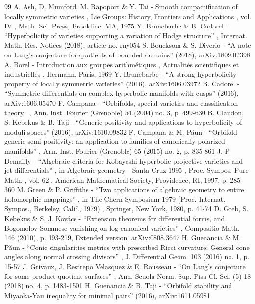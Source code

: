 \documentclass[10pt]{amsart}
\theoremstyle{plain}
\theoremstyle{definition}
\numberwithin{equation}{theorem}
\begin{document}
\begin{thebibliography}{99}
 A. Ash, D. Mumford, M. Rapoport \& Y. Tai - Smooth compactification of locally symmetric varieties , Lie Groups: History, Frontiers and Applications , vol. IV , Math. Sci. Press, Brookline, MA, 1975
 Y. Brunebarbe \& B. Cadorel - “Hyperbolicity of varieties supporting a variation of Hodge structure” , Internat. Math. Res. Notices (2018), article no. rny054
 S. Boucksom \& S. Diverio - “A note on Lang’s conjecture for quotients of bounded domains” (2018), arXiv:1809.02398
 A. Borel - Introduction aux groupes arithmétiques , Actualités scientifiques et industrielles , Hermann, Paris, 1969
 Y. Brunebarbe - “A strong hyperbolicity property of locally symmetric varieties” (2016), arXiv:1606.03972
 B. Cadorel - “Symmetric differentials on complex hyperbolic manifolds with cusps” (2016), arXiv:1606.05470
 F. Campana - “Orbifolds, special varieties and classification theory” , Ann. Inst. Fourier (Grenoble) 54 (2004) no. 3, p. 499-630
 B. Claudon, S. Kebekus \& B. Taji - “Generic positivity and applications to hyperbolicity of moduli spaces” (2016), arXiv:1610.09832
 F. Campana \& M. Păun - “Orbifold generic semi-positivity: an application to families of canonically polarized manifolds” , Ann. Inst. Fourier (Grenoble) 65 (2015) no. 2, p. 835-861
 J.-P. Demailly - “Algebraic criteria for Kobayashi hyperbolic projective varieties and jet differentials” , in Algebraic geometry—Santa Cruz 1995 , Proc. Sympos. Pure Math. , vol. 62 , American Mathematical Society, Providence, RI, 1997, p. 285-360
 M. Green \& P. Griffiths - “Two applications of algebraic geometry to entire holomorphic mappings” , in The Chern Symposium 1979 (Proc. Internat. Sympos., Berkeley, Calif., 1979) , Springer, New York, 1980, p. 41-74
 D. Greb, S. Kebekus \& S. J. Kovács - “Extension theorems for differential forms, and Bogomolov-Sommese vanishing on log canonical varieties” , Compositio Math. 146 (2010), p. 193-219, Extended version: arXiv:0808.3647
 H. Guenancia \& M. Păun - “Conic singularities metrics with prescribed Ricci curvature: General cone angles along normal crossing divisors” , J. Differential Geom. 103 (2016) no. 1, p. 15-57
 J. Grivaux, J. Restrepo Velasquez \& E. Rousseau - “On Lang’s conjecture for some product-quotient surfaces” , Ann. Scuola Norm. Sup. Pisa Cl. Sci. (5) 18 (2018) no. 4, p. 1483-1501
 H. Guenancia \& B. Taji - “Orbifold stability and Miyaoka-Yau inequality for minimal pairs” (2016), arXiv:1611.05981

\end{thebibliography}
\end{document}
